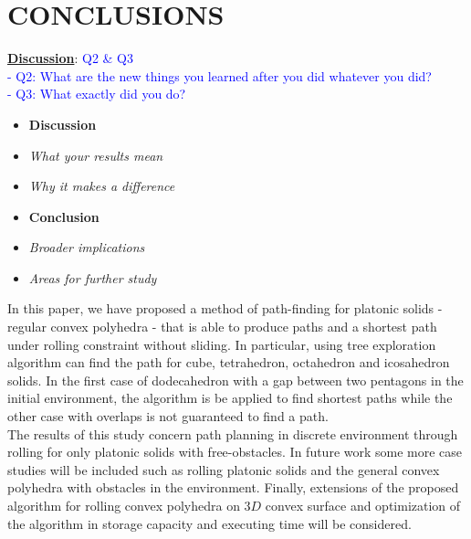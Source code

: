 
\section{CONCLUSIONS}
\noindent\uline{\textbf{Discussion}}: 
\textcolor{blue}{Q2 \& Q3\\
- Q2: What are the new things you learned after you did whatever you did?\\
- Q3: What exactly did you do?}

\begin{itemize}
\color{red}
\item \textbf{Discussion}
\item \textit{What your results mean}
\item \textit{Why it makes a difference}
\item \textbf{Conclusion}
\item \textit{Broader implications}
\item \textit{Areas for further study}
\end{itemize}

\noindent In this paper, we have proposed a method of path-finding for platonic solids - regular convex polyhedra - that is able to produce paths and a shortest path under rolling constraint without sliding. In particular, using tree exploration algorithm can find the path for cube, tetrahedron, octahedron and icosahedron solids. In the first case of dodecahedron with a gap between two pentagons in the initial environment, the algorithm is be applied to find shortest paths while the other case with overlaps is not guaranteed to find a path.\\


\noindent The results of this study concern path planning in discrete environment through rolling for only platonic solids with free-obstacles.
In future work some more case studies will be included such as rolling platonic solids and the general convex polyhedra with obstacles in the environment. 
Finally, extensions of the proposed algorithm for rolling convex polyhedra on $3D$ convex surface and optimization of the algorithm in storage capacity and executing time will be considered.\\

